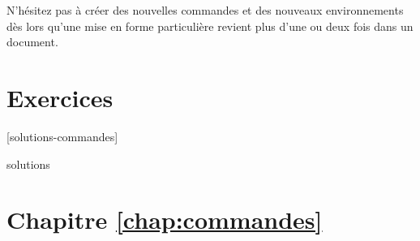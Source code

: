 \begin{conseil}
  N'hésitez pas à créer des nouvelles commandes et des nouveaux
  environnements dès lors qu'une mise en forme particulière revient
  plus d'une ou deux fois dans un document.
\end{conseil}




\section{Exercices}
\label{sec:commandes:exercices}

[solutions-commandes]

\begin{Filesave}{solutions}
\section*{Chapitre \ref*{chap:commandes}}

\end{Filesave}

